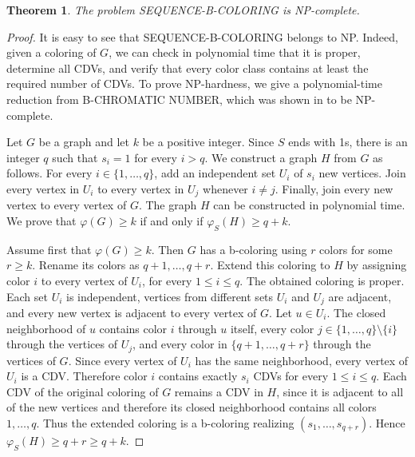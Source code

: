 \documentclass{article}
\newtheorem{theorem}{Theorem}[section]
\theoremstyle{definition}
\begin{document}
\begin{theorem}
The problem SEQUENCE-B-COLORING is NP-complete.
\end{theorem}

\begin{proof}
It is easy to see that SEQUENCE-B-COLORING belongs to NP. Indeed, given a coloring of $G$, we can check in polynomial time that it is proper, determine all CDVs, and verify that every color class contains at least the required number of CDVs. To prove NP-hardness, we give a polynomial-time reduction from B-CHROMATIC NUMBER, which was shown in \cite[Theorem~8]{Irving} to be NP-complete.

Let $G$ be a graph and let $k$ be a positive integer. Since $S$ ends with 1s, there is an integer $q$ such that $s_i=1$ for every $i>q$. We construct a graph $H$ from $G$ as follows. For every $i\in\{1,\ldots,q\}$, add an independent set $U_i$ of $s_i$ new vertices. Join every vertex in $U_i$ to every vertex in $U_j$ whenever $i\neq j$. Finally, join every new vertex to every vertex of $G$. The graph $H$ can be constructed in polynomial time. We prove that $\varphi(G)\geq k$ if and only if $\varphi_S(H)\geq q+k$.

Assume first that $\varphi(G)\geq k$. Then $G$ has a b-coloring using $r$ colors for some $r\geq k$. Rename its colors as $q+1,\ldots,q+r$. Extend this coloring to $H$ by assigning color $i$ to every vertex of $U_i$, for every $1\leq i\leq q$. The obtained coloring is proper. Each set $U_i$ is independent, vertices from different sets $U_i$ and $U_j$ are adjacent, and every new vertex is adjacent to every vertex of $G$. Let $u\in U_i$. The closed neighborhood of $u$ contains color $i$ through $u$ itself, every color $j\in\{1,\ldots,q\}\setminus\{i\}$ through the vertices of $U_j$, and every color in $\{q+1,\ldots,q+r\}$ through the vertices of $G$. Since every vertex of $U_i$ has the same neighborhood, every vertex of $U_i$ is a CDV. Therefore color $i$ contains exactly $s_i$ CDVs for every $1\leq i\leq q$. 
Each CDV of the original coloring of $G$ remains a CDV in $H$, since it is adjacent to all of the new vertices and therefore its closed neighborhood contains all colors $1,\ldots,q$.
Thus the extended coloring is a b-coloring realizing $(s_1,\ldots,s_{q+r})$. Hence $\varphi_S(H)\geq q+r\geq q+k$.


\end{proof}
\end{document}
